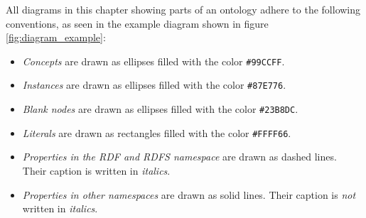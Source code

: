 
All diagrams in this chapter showing parts of an ontology adhere to the following conventions, as seen in the example diagram shown in figure \ref{fig:diagram_example}:
\begin{itemize}
  \item \emph{Concepts} are drawn as ellipses filled with the color \texttt{\textcolor{convention_color1}{\#99CCFF}}.
  \item \emph{Instances} are drawn as ellipses filled with the color \texttt{\textcolor{convention_color2}{\#87E776}}.
  \item \emph{Blank nodes} are drawn as ellipses filled with the color \texttt{\textcolor{convention_color3}{\#23B8DC}}.
  \item \emph{Literals} are drawn as rectangles filled with the color \texttt{\colorbox{convention_color_bg4}{\textcolor{convention_color4}{\#FFFF66}}}.
  \item \emph{Properties in the RDF\cite{RDF} and RDFS\cite{RDFS} namespace} are drawn as dashed lines. Their caption is written in \emph{italics}.
  \item \emph{Properties in other namespaces} are drawn as solid lines. Their caption is \emph{not} written in \emph{italics}.
\end{itemize}

